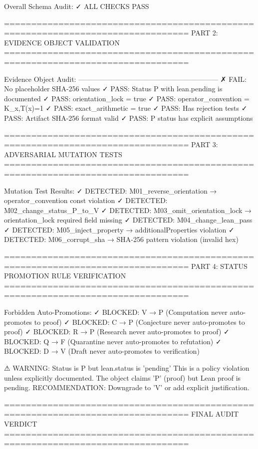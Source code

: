   Overall Schema Audit: ✓ ALL CHECKS PASS

================================================================================
PART 2: EVIDENCE OBJECT VALIDATION
================================================================================

Evidence Object Audit:
------------------------------------------------------------
  ✗ FAIL: No placeholder SHA-256 values
  ✓ PASS: Status P with lean.pending is documented
  ✓ PASS: orientation_lock = true
  ✓ PASS: operator_convention = K_x,T(x)=1
  ✓ PASS: exact_arithmetic = true
  ✓ PASS: Has rejection tests
  ✓ PASS: Artifact SHA-256 format valid
  ✓ PASS: P status has explicit assumptions

================================================================================
PART 3: ADVERSARIAL MUTATION TESTS
================================================================================

  Mutation Test Results:
    ✓ DETECTED: M01_reverse_orientation
      → operator_convention const violation
    ✓ DETECTED: M02_change_status_P_to_V
    ✓ DETECTED: M03_omit_orientation_lock
      → orientation_lock required field missing
    ✓ DETECTED: M04_change_lean_pass
    ✓ DETECTED: M05_inject_property
      → additionalProperties violation
    ✓ DETECTED: M06_corrupt_sha
      → SHA-256 pattern violation (invalid hex)

================================================================================
PART 4: STATUS PROMOTION RULE VERIFICATION
================================================================================

  Forbidden Auto-Promotions:
    ✓ BLOCKED: V → P (Computation never auto-promotes to proof)
    ✓ BLOCKED: C → P (Conjecture never auto-promotes to proof)
    ✓ BLOCKED: R → P (Research never auto-promotes to proof)
    ✓ BLOCKED: Q → F (Quarantine never auto-promotes to refutation)
    ✓ BLOCKED: D → V (Draft never auto-promotes to verification)

  ⚠ WARNING: Status is P but lean.status is 'pending'
    This is a policy violation unless explicitly documented.
    The object claims 'P' (proof) but Lean proof is pending.
    RECOMMENDATION: Downgrade to 'V' or add explicit justification.

================================================================================
FINAL AUDIT VERDICT
================================================================================

